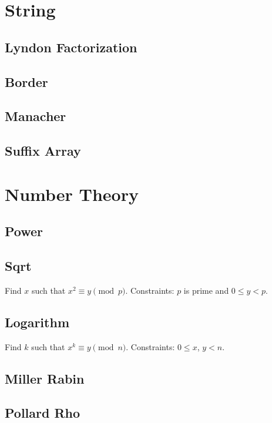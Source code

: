 \documentclass{article}
\begin{document}
\begin{multicols}{2}
    \section{String}
    \subsection{Lyndon Factorization}
    
    \subsection{Border}
    
    \subsection{Manacher}
    
    \subsection{Suffix Array}
    

    \section{Number Theory}
    \subsection{Power}
    
    \subsection{Sqrt}
    Find $x$ such that $x^2\equiv y\pmod p$.
    \newline Constraints: $p$ is prime and $0\le y<p$.
    
    \subsection{Logarithm}
    Find $k$ such that $x^k\equiv y\pmod n$.
    \newline Constraints: $0\le x$, $y<n$.
    
    \subsection{Miller Rabin}
    
    \subsection{Pollard Rho}
    

\end{multicols}
\end{document}
